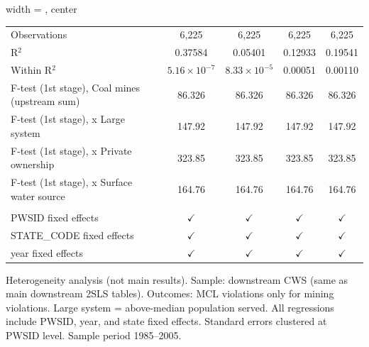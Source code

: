 \begin{table}[htbp]
\begin{adjustbox}{width = \textwidth, center}
\begin{tabular}{lcccc}
          \\
         
         Observations                                  & 6,225                 & 6,225                 & 6,225                     & 6,225\\  
         R$^2$                                         & 0.37584               & 0.05401               & 0.12933                   & 0.19541\\  
         Within R$^2$                                  & $5.16\times 10^{-7}$  & $8.33\times 10^{-5}$  & 0.00051                   & 0.00110\\  
         F-test (1st stage), Coal mines (upstream sum) & 86.326                & 86.326                & 86.326                    & 86.326\\  
         F-test (1st stage),   x Large system          & 147.92                & 147.92                & 147.92                    & 147.92\\  
         F-test (1st stage),   x Private ownership     & 323.85                & 323.85                & 323.85                    & 323.85\\  
         F-test (1st stage),   x Surface water source  & 164.76                & 164.76                & 164.76                    & 164.76\\  
         
          \\
         
         PWSID fixed effects                           & $\checkmark$          & $\checkmark$          & $\checkmark$              & $\checkmark$\\   
         STATE\_CODE fixed effects                     & $\checkmark$          & $\checkmark$          & $\checkmark$              & $\checkmark$\\   
         year fixed effects                            & $\checkmark$          & $\checkmark$          & $\checkmark$              & $\checkmark$\\   
         
         \bottomrule
         
      \end{tabular}
      
      
      
   \end{adjustbox}
      {\tiny\linespread{1}\selectfont \par \raggedright 
   Heterogeneity analysis (not main results). Sample: downstream CWS (same as main downstream 2SLS tables). Outcomes: MCL violations only for mining violations. Large system = above-median population served. All regressions include PWSID, year, and state fixed effects. Standard errors clustered at PWSID level. Sample period 1985--2005.}
   
\end{table}


